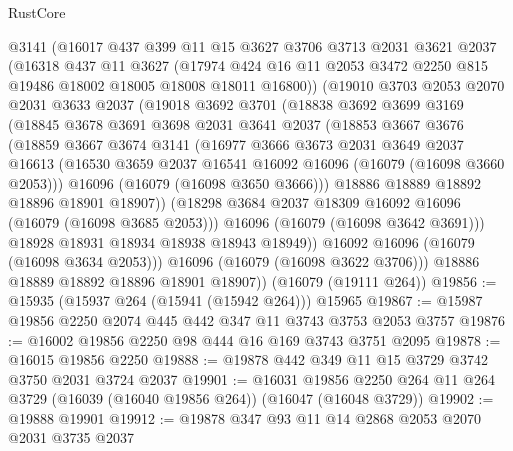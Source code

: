 \begin{lexlean}{RustCore}
\begin{coremodule}
        @3141
        (@16017
          @437
          @399
          @11
          @15
          @3627
          @3706
          @3713
          @2031
          @3621
          @2037
          (@16318
            @437
            @11
            @3627
            (@17974 @424 @16 @11 @2053 @3472 @2250 @815 @19486 @18002 @18005 @18008 @18011 @16800))
          (@19010
            @3703
            @2053
            @2070
            @2031
            @3633
            @2037
            (@19018
              @3692
              @3701
              (@18838
                @3692
                @3699
                @3169
                (@18845
                  @3678
                  @3691
                  @3698
                  @2031
                  @3641
                  @2037
                  (@18853
                    @3667
                    @3676
                    (@18859
                      @3667
                      @3674
                      @3141
                      (@16977
                        @3666
                        @3673
                        @2031
                        @3649
                        @2037
                        @16613
                        (@16530 @3659 @2037 @16541 @16092 @16096 (@16079 (@16098 @3660 @2053)))
                        @16096
                        (@16079 (@16098 @3650 @3666)))
                      @18886
                      @18889
                      @18892
                      @18896
                      @18901
                      @18907))
                  (@18298 @3684 @2037 @18309 @16092 @16096 (@16079 (@16098 @3685 @2053)))
                  @16096
                  (@16079 (@16098 @3642 @3691)))
                @18928
                @18931
                @18934
                @18938
                @18943
                @18949))
            @16092
            @16096
            (@16079 (@16098 @3634 @2053)))
          @16096
          (@16079 (@16098 @3622 @3706)))
        @18886
        @18889
        @18892
        @18896
        @18901
        @18907))
    (@16079 (@19111 @264))
@19856 := @15935 (@15937 @264 (@15941 (@15942 @264))) @15965
@19867 := @15987 @19856 @2250 @2074 @445 @442 @347 @11 @3743 @3753 @2053 @3757
@19876 := @16002 @19856 @2250 @98 @444 @16 @169 @3743 @3751 @2095
@19878 := @16015 @19856 @2250
@19888 := @19878 @442 @349 @11 @15 @3729 @3742 @3750 @2031 @3724 @2037
@19901 := @16031
    @19856
    @2250
    @264
    @11
    @264
    @3729
    (@16039 (@16040 @19856 @264))
    (@16047 (@16048 @3729))
@19902 := @19888 @19901
@19912 := @19878 @347 @93 @11 @14 @2868 @2053 @2070 @2031 @3735 @2037

\end{coremodule}
\end{lexlean}
